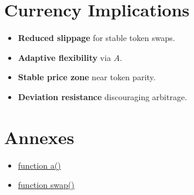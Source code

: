 \documentclass[12pt]{article}
\begin{document}
\section{Currency Implications}

\begin{itemize}
    \item \textbf{Reduced slippage} for stable token swaps.
    \item \textbf{Adaptive flexibility} via $A$.
    \item \textbf{Stable price zone} near token parity.
    \item \textbf{Deviation resistance} discouraging arbitrage.
\end{itemize}

\section*{Annexes}

\begin{itemize}
    \item \href{https://github.com/AquaToken/soroban-amm/blob/main/liquidity_pool_stableswap/src/contract.rs#L72}{function a()}
    \item \href{https://github.com/AquaToken/soroban-amm/blob/main/liquidity_pool_stableswap/src/contract.rs#L112}{function swap()}
\end{itemize}
\end{document}
